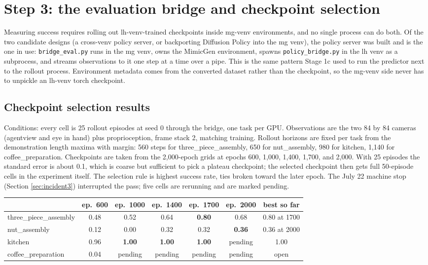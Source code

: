 \documentclass[11pt]{article}
\begin{document}
\section{Step 3: the evaluation bridge and checkpoint selection}
\label{sec:eval}

Measuring success requires rolling out lh-venv-trained checkpoints inside
mg-venv environments, and no single process can do both. Of the two candidate
designs (a cross-venv policy server, or backporting Diffusion Policy into the
mg venv), the policy server was built and is the one in use:
\texttt{bridge\_eval.py} runs in the mg venv, owns the MimicGen environment,
spawns \texttt{policy\_bridge.py} in the lh venv as a subprocess, and streams
observations to it one step at a time over a pipe. This is the same pattern
Stage 1c used to run the predictor next to the rollout process. Environment
metadata comes from the converted dataset rather than the checkpoint, so the
mg-venv side never has to unpickle an lh-venv torch checkpoint.

\subsection{Checkpoint selection results}
\label{sec:select-results}

Conditions: every cell is 25 rollout episodes at seed 0 through the bridge,
one task per GPU. Observations are the two 84 by 84 cameras (agentview and
eye in hand) plus proprioception, frame stack 2, matching training. Rollout
horizons are fixed per task from the demonstration length maxima with margin:
560 steps for three\_piece\_assembly, 650 for nut\_assembly, 980 for kitchen,
1,140 for coffee\_preparation. Checkpoints are taken from the 2,000-epoch
grids at epochs 600, 1,000, 1,400, 1,700, and 2,000. With 25 episodes the
standard error is about 0.1, which is coarse but sufficient to pick a plateau
checkpoint; the selected checkpoint then gets full 50-episode cells in the
experiment itself. The selection rule is highest success rate, ties broken
toward the later epoch. The July 22 machine stop (Section
\ref{sec:incident3}) interrupted the pass; five cells are rerunning and are
marked pending.

\begin{center}
\small
\begin{tabular}{@{}lcccccc@{}}
\toprule
 & ep.\ 600 & ep.\ 1000 & ep.\ 1400 & ep.\ 1700 & ep.\ 2000 & best so far \\
\midrule
three\_piece\_assembly & 0.48 & 0.52 & 0.64 & \textbf{0.80} & 0.68 & 0.80 at 1700 \\
nut\_assembly          & 0.12 & 0.00 & 0.32 & 0.32 & \textbf{0.36} & 0.36 at 2000 \\
kitchen                & 0.96 & \textbf{1.00} & \textbf{1.00} & \textbf{1.00} & pending & 1.00 \\
coffee\_preparation    & 0.04 & pending & pending & pending & pending & open \\
\bottomrule
\end{tabular}
\end{center}
\end{document}
